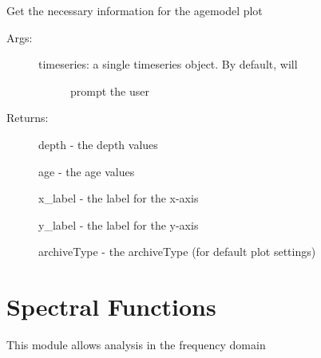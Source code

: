 \documentclass[letterpaper,10pt,english]{sphinxmanual}
\begin{document}
\begin{fulllineitems}
\label{\detokenize{SummaryPlots:pyleoclim.SummaryPlots.agemodelData}}
Get the necessary information for the agemodel plot
\begin{description}
\item[{Args:}] \leavevmode\begin{description}
\item[{timeseries: a single timeseries object. By default, will}] \leavevmode
prompt the user

\end{description}

\item[{Returns:}] \leavevmode
depth - the depth values

age - the age values

x\_label - the label for the x-axis

y\_label - the label for the y-axis

archiveType - the archiveType (for default plot settings)

\end{description}

\end{fulllineitems}



\chapter{Spectral Functions}
\label{\detokenize{Spectral:spectral-functions}}\label{\detokenize{Spectral::doc}}
This module allows analysis in the frequency domain
\end{document}
